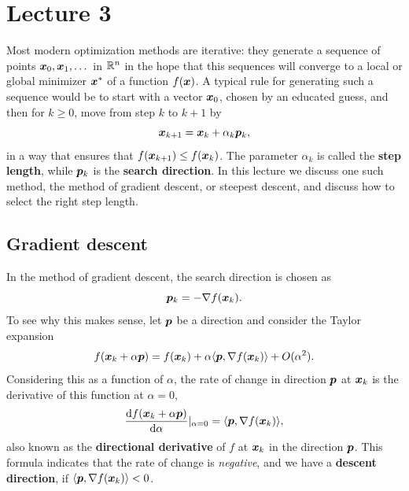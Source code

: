 %
%
% 


\chapter*{Lecture 3}
\setcounter{chapter}{3}
\setcounter{equation}{0}
\setcounter{theorem}{0}
\setcounter{section}{0}

Most modern optimization methods are iterative: they generate a sequence of points $\bm{x}_0,\bm{x}_1,\dots$ in $\mathbb{R}^n$
in the hope that this sequences will converge to a local or global minimizer $\bm{x}^*$ of a function $f(\bm{x})$. A typical rule for generating such a sequence would be to start with a vector $\bm{x}_0$, chosen by an educated guess, and then for $k\geq 0$, move from step $k$ to $k+1$ by
\begin{equation*}
 \bm{x}_{k+1} = \bm{x}_k+\alpha_k\bm{p}_k,
\end{equation*}
in a way that ensures that $f(\bm{x}_{k+1})\leq f(\bm{x}_k)$.
The parameter $\alpha_k$ is called the \textbf{step length}, while $\bm{p}_k$ is the \textbf{search direction}. In this lecture we discuss one such method, the method of gradient descent, or steepest descent, and discuss how to select the right step length.

\section{Gradient descent} 
In the method of gradient descent, the search direction is chosen as
\begin{equation}\label{eq:gradient}
 \bm{p}_k = -\nabla f(\bm{x}_k).
\end{equation}
To see why this makes sense, let $\bm{p}$ be a direction and consider the Taylor expansion
\begin{equation*}
 f(\bm{x}_k+\alpha \bm{p}) = f(\bm{x}_k)+\alpha \langle {\bm{p}}, {\nabla f(\bm{x}_k)} \rangle+O(\alpha^2).
\end{equation*}
Considering this as a function of $\alpha$, the rate of change in direction $\bm{p}$ at $\bm{x}_k$ is the derivative of this function at $\alpha=0$,
\begin{equation*}
 \frac{\mathrm{d}{f}(\bm{x}_k+\alpha \bm{p})}{\mathrm{d}{\alpha}}|_{\alpha=0} = \langle {\bm{p}}, {\nabla f(\bm{x}_k)} \rangle,
\end{equation*}
also known as the \textbf{directional derivative} of $f$ at $\bm{x}_k$ in the direction $\bm{p}$.
This formula indicates that the rate of change is {\em negative}, and we have a \textbf{descent direction}, if $\langle {\bm{p}}, {\nabla f(\bm{x}_k)} \rangle<0$. 

